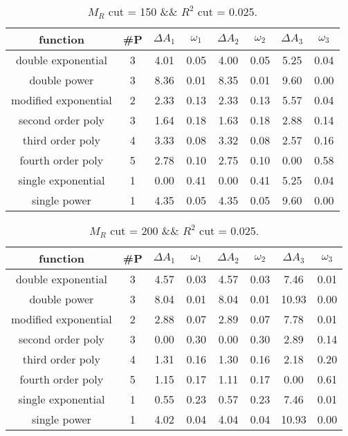  
\begin{table}[H] 
\begin{center} 
\begin{tabular}{|c|c|cc|cc|cc|} 
\hline function & \#P & $\Delta A_1$ & $\omega_1$ & $\Delta A_2$ & $\omega_2$ & $\Delta A_3$ & $\omega_3$ \\ \hline 
double exponential &  3 &   4.01 &   0.05 &   4.00 &   0.05 &   5.25 &   0.04 \\ 
double power &  3 &   8.36 &   0.01 &   8.35 &   0.01 &   9.60 &   0.00 \\ 
modified exponential &  2 &   2.33 &   0.13 &   2.33 &   0.13 &   5.57 &   0.04 \\ 
second order poly &  3 &   1.64 &   0.18 &   1.63 &   0.18 &   2.88 &   0.14 \\ 
third order poly &  4 &   3.33 &   0.08 &   3.32 &   0.08 &   2.57 &   0.16 \\ 
fourth order poly &  5 &   2.78 &   0.10 &   2.75 &   0.10 &   0.00 &   0.58 \\ 
single exponential &  1 &   0.00 &   0.41 &   0.00 &   0.41 &   5.25 &   0.04 \\ 
single power &  1 &   4.35 &   0.05 &   4.35 &   0.05 &   9.60 &   0.00 \\ 
\hline 
\end{tabular} 
\caption{$M_R$ cut = 150 \&\& $R^2$ cut = 0.025.} 
\label{tab:FitChoices_150_0.025} 
\end{center} 
\end{table} 
 
 
\begin{table}[H] 
\begin{center} 
\begin{tabular}{|c|c|cc|cc|cc|} 
\hline function & \#P & $\Delta A_1$ & $\omega_1$ & $\Delta A_2$ & $\omega_2$ & $\Delta A_3$ & $\omega_3$ \\ \hline 
double exponential &  3 &   4.57 &   0.03 &   4.57 &   0.03 &   7.46 &   0.01 \\ 
double power &  3 &   8.04 &   0.01 &   8.04 &   0.01 &  10.93 &   0.00 \\ 
modified exponential &  2 &   2.88 &   0.07 &   2.89 &   0.07 &   7.78 &   0.01 \\ 
second order poly &  3 &   0.00 &   0.30 &   0.00 &   0.30 &   2.89 &   0.14 \\ 
third order poly &  4 &   1.31 &   0.16 &   1.30 &   0.16 &   2.18 &   0.20 \\ 
fourth order poly &  5 &   1.15 &   0.17 &   1.11 &   0.17 &   0.00 &   0.61 \\ 
single exponential &  1 &   0.55 &   0.23 &   0.57 &   0.23 &   7.46 &   0.01 \\ 
single power &  1 &   4.02 &   0.04 &   4.04 &   0.04 &  10.93 &   0.00 \\ 
\hline 
\end{tabular} 
\caption{$M_R$ cut = 200 \&\& $R^2$ cut = 0.025.} 
\label{tab:FitChoices_200_0.025} 
\end{center} 
\end{table} 
 
